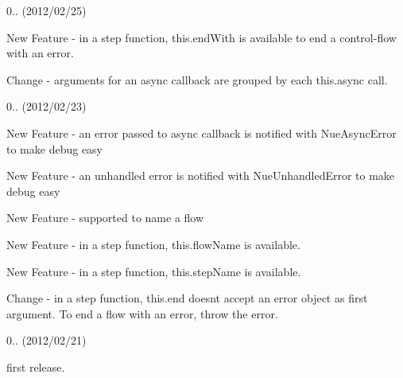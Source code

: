 \begin{DoxyItemize}
\begin{DoxyItemize}
\end{DoxyItemize}
\item 0.. (2012/02/25)
\begin{DoxyItemize}
\item New Feature -\/ in a step function, {\ttfamily this.\+end\+With} is available to end a control-\/flow with an error.
\item Change -\/ {\ttfamily arguments} for an async callback are grouped by each {\ttfamily this.\+async} call.
\end{DoxyItemize}
\item 0.. (2012/02/23)
\begin{DoxyItemize}
\item New Feature -\/ an error passed to async callback is notified with Nue\+Async\+Error to make debug easy
\item New Feature -\/ an unhandled error is notified with Nue\+Unhandled\+Error to make debug easy
\item New Feature -\/ supported to name a flow
\item New Feature -\/ in a step function, {\ttfamily this.\+flow\+Name} is available.
\item New Feature -\/ in a step function, {\ttfamily this.\+step\+Name} is available.
\item Change -\/ in a step function, {\ttfamily this.\+end} doesn\textquotesingle{}t accept an error object as first argument. To end a flow with an error, {\ttfamily throw} the error.
\end{DoxyItemize}
\item 0.. (2012/02/21)
\begin{DoxyItemize}
\item first release. 
\end{DoxyItemize}
\end{DoxyItemize}